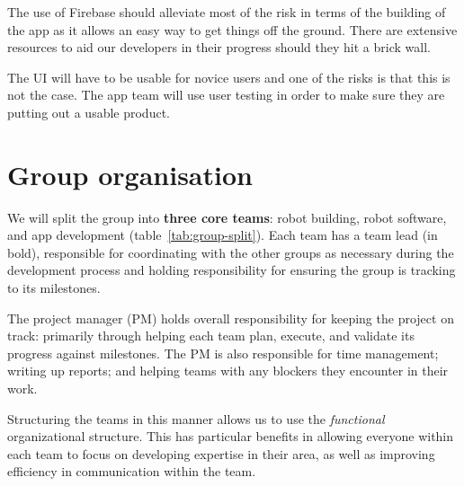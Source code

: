 \documentclass{article}
\begin{document}
The use of Firebase should alleviate most of the risk in terms of the building of the app as it allows an easy way to get things off the ground. There are extensive resources to aid our developers in their progress should they hit a brick wall.

The UI will have to be usable for novice users and one of the risks is that this is not the case. The app team will use user testing in order to make sure they are putting out a usable product.


\section{Group organisation}
\begin{table}[]
  \caption{Team splits across the group. Names in bold are key points of contact.}
  \label{tab:group-split}
\end{table}

We will split the group into {\bf three core teams}: robot building, robot software, and app development (table~\ref{tab:group-split}). Each team has a team lead (in bold), responsible for coordinating with the other groups as necessary during the development process and holding responsibility for ensuring the group is tracking to its milestones.

The project manager (PM) holds overall responsibility for keeping the project on track: primarily through helping each team plan, execute, and validate its progress against milestones. The PM is also responsible for time management; writing up reports; and helping teams with any blockers they encounter in their work.

Structuring the teams in this manner allows us to use the {\it functional} organizational structure. This has particular benefits in allowing everyone within each team to focus on developing expertise in their area, as well as improving efficiency in communication within the team.
\end{document}

